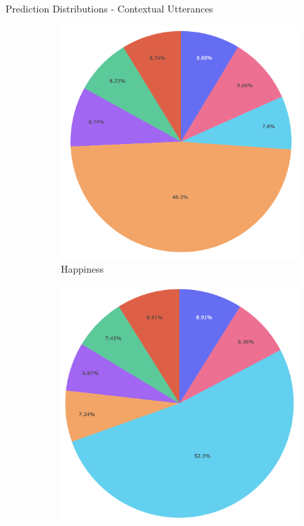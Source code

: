 \documentclass[11pt,aspectratio=169]{beamer}
\begin{document}
\begin{frame}{Prediction Distributions - Contextual Utterances}
\begin{figure}[!ht]
    \medskip
    \begin{subfigure}{0.19\textwidth}
      \includegraphics[width=\linewidth]{figures/happiness_context.png}
      \caption*{Happiness}
    \end{subfigure}\hfil 
    \begin{subfigure}{0.19\textwidth}
      \includegraphics[width=\linewidth]{figures/sadness_context.png}

\end{subfigure}
\end{figure}
\end{frame}
\end{document}
